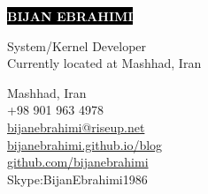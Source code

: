 \documentclass[12pt]{developercv}
\begin{document}
\begin{minipage}[t]{0.65\textwidth} %
	\vspace{-\baselineskip} %
	
	\colorbox{black}{{\HUGE\textcolor{white}{\textbf{\MakeUppercase{Bijan Ebrahimi}}}}} %
	
	\vspace{6pt}
	
	{\huge System/Kernel Developer}\\ %
	{Currently located at Mashhad, Iran}
\end{minipage}
\begin{minipage}[t]{0.35\textwidth} %
	\vspace{-\baselineskip} %
	
	{Mashhad, Iran}\\
	{+98 901 963 4978}\\
	{\href{mailto:bijanebrahimi@riseup.net}{bijanebrahimi@riseup.net}}\\	
	{\href{https://bijanebrahimi.github.io/blog}{bijanebrahimi.github.io/blog}}\\
	{\href{https://github.com/bijanebrahimi}{github.com/bijanebrahimi}}\\
	{{Skype:BijanEbrahimi1986}}
\end{minipage}

\vspace{0.5cm}


\end{document}
